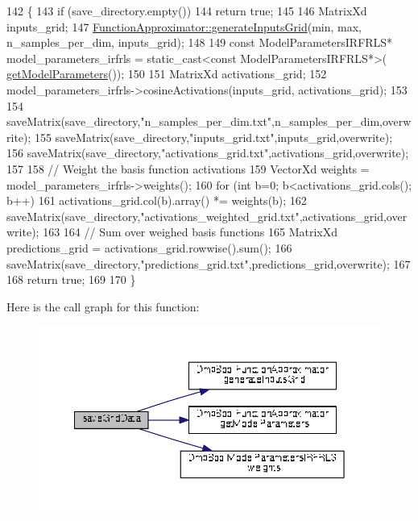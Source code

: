 \begin{DoxyCode}
142 \{
143   \textcolor{keywordflow}{if} (save\_directory.empty())
144     \textcolor{keywordflow}{return} \textcolor{keyword}{true};
145   
146   MatrixXd inputs\_grid;
147   \hyperlink{classDmpBbo_1_1FunctionApproximator_a61da4383ffab7d919c98d628c1d217d1}{FunctionApproximator::generateInputsGrid}(min, max, 
      n\_samples\_per\_dim, inputs\_grid);
148       
149   \textcolor{keyword}{const} ModelParametersIRFRLS* model\_parameters\_irfrls = \textcolor{keyword}{static\_cast<}\textcolor{keyword}{const }ModelParametersIRFRLS*\textcolor{keyword}{>}(
      \hyperlink{classDmpBbo_1_1FunctionApproximator_a0e7e116ed9b159d782fca544dacb4bac}{getModelParameters}());
150   
151   MatrixXd activations\_grid;
152   model\_parameters\_irfrls->cosineActivations(inputs\_grid, activations\_grid);
153   
154   saveMatrix(save\_directory,\textcolor{stringliteral}{"n\_samples\_per\_dim.txt"},n\_samples\_per\_dim,overwrite);
155   saveMatrix(save\_directory,\textcolor{stringliteral}{"inputs\_grid.txt"},inputs\_grid,overwrite);
156   saveMatrix(save\_directory,\textcolor{stringliteral}{"activations\_grid.txt"},activations\_grid,overwrite);
157 
158   \textcolor{comment}{// Weight the basis function activations  }
159   VectorXd weights = model\_parameters\_irfrls->weights();
160   \textcolor{keywordflow}{for} (\textcolor{keywordtype}{int} b=0; b<activations\_grid.cols(); b++)
161     activations\_grid.col(b).array() *= weights(b);
162   saveMatrix(save\_directory,\textcolor{stringliteral}{"activations\_weighted\_grid.txt"},activations\_grid,overwrite);
163   
164   \textcolor{comment}{// Sum over weighed basis functions}
165   MatrixXd predictions\_grid = activations\_grid.rowwise().sum();
166   saveMatrix(save\_directory,\textcolor{stringliteral}{"predictions\_grid.txt"},predictions\_grid,overwrite);
167   
168   \textcolor{keywordflow}{return} \textcolor{keyword}{true};
169   
170 \}
\end{DoxyCode}


Here is the call graph for this function\+:
\nopagebreak
\begin{figure}[H]
\begin{center}
\leavevmode
\includegraphics[width=350pt]{classDmpBbo_1_1FunctionApproximatorIRFRLS_a53d95f63de3b49491b1204f45a24ae25_cgraph}
\end{center}
\end{figure}




